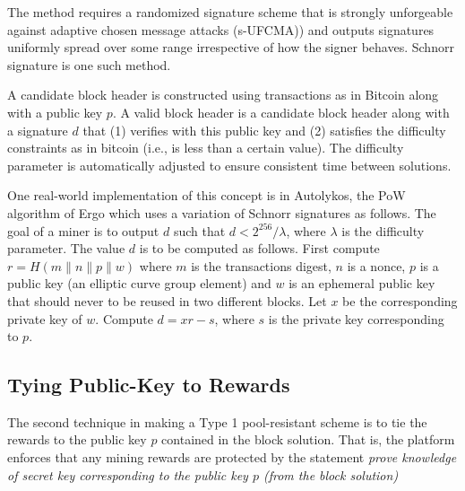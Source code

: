 \documentclass[11pt]{article}
\newcommand{\powname}{Autolykos\xspace}
\begin{document}
The method requires a randomized signature scheme that is strongly unforgeable against adaptive chosen message attacks (s-UFCMA)) and outputs signatures uniformly spread over some range irrespective of how the signer behaves. Schnorr signature is one such method.

A candidate block header is constructed using transactions as in Bitcoin along with a public key $p$. A valid block header is a candidate block header along with a signature $d$ that (1) verifies with this public key and (2) satisfies the difficulty constraints as in bitcoin (i.e., is less than a certain value). The difficulty parameter is automatically adjusted to ensure consistent time between solutions.

One real-world implementation of this concept is in \powname, the PoW algorithm of Ergo which uses a variation of Schnorr signatures as follows. The goal of a miner is to output $d$ such that $d < 2^{256}/\lambda$, where $\lambda$ is the difficulty parameter. The value $d$ is to be computed as follows. First compute $r = H(m\|n\|p\|w)$ where $m$ is the transactions digest, $n$ is a nonce, $p$ is a public key (an elliptic curve group element) and $w$ is an ephemeral public key that should never to be reused in two different blocks. Let $x$ be the corresponding private key of $w$. Compute $d = xr - s$, where $s$ is the private key corresponding to $p$.




\subsection{Tying Public-Key to Rewards}

The second technique in making a Type 1 pool-resistant scheme is to tie the rewards to the public key $p$ contained in the block solution. That is, the platform enforces that any mining rewards are protected by the statement {\em prove knowledge of secret key corresponding to the public key $p$ (from the block solution)}
\end{document}
